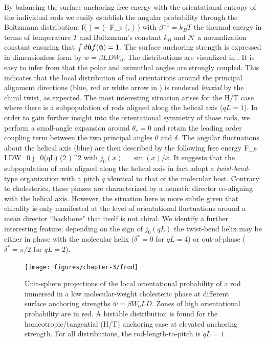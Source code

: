 By balancing the surface anchoring free energy with the orientational entropy of the individual rods we easily establish the angular probability through the Boltzmann distribution:
  \beq
  f( \bhu ) =  \exp (- \beta F_{s} (\delta, \theta)  )
  \label{fsingle}
  \eeq
 with $\beta^{-1} = k_{B}T$ the thermal energy in terms of temperature $T$ and Boltzmann's constant $k_{B}$ and $\mathcal{N}$ a normalization constant ensuring that $\int d {\bf \hat{u}} f({\bf \hat{u}}) = 1$.  The surface anchoring strength is expressed  in dimensionless form by $\bar{w} = \beta LDW_{0}$.  The distributions are visualized in .
It is easy to infer from  that the polar and azimuthal angles are strongly coupled. This indicates that the local distribution of rod orientations around the principal alignment directions (blue, red or white arrow in ) is rendered {\em biaxial} by the chiral twist, as expected.  The most interesting situation arises for the H/T case where there is a subpopulation of  rods aligned along the helical axis ($qL=1$). In order to gain further insight into the orientational symmetry of those rods, we perform a small-angle expansion around   $\theta_{e} = 0$ and retain the leading order coupling term between the two principal angles $\theta$ and $\delta$. The angular fluctuations about the helical axis (blue) are then described by the following free energy
\beq
F_{s} \approx {} LDW_{0}  j_{0}(qL) \cos (2 \delta) \theta^{2}
\label{ht_fluc_new}
\eeq
with $j_{0}(x) = \sin (x)/x$. It suggests that the subpopulation of rods aligned along the helical axis in fact adopt a {\em twist-bend}-type organization with a pitch $q$ identical to that of the molecular host. Contrary to cholesterics, these phases are characterized by a nematic director co-aligning with the helical axis. However, the situation here is more subtle given that  chirality is only manifested at the level of orientational fluctuations around a mean director ``backbone" that itself is not chiral.   We  identify a further interesting feature; depending on the sign of $j_{0}(qL)$ the twist-bend helix may be either in phase with the molecular helix ($\delta^{\ast} =0$ for  $qL=4$) or out-of-phase ($\delta^{\ast} = \pi/2$ for $qL=2$).


  \begin{figure}
	\texttt{[image: figures/chapter-3/frod]}
	\caption[Unit-sphere projections of the local orientational probability of a rod immersed in a low molecular-weight cholesteric]{ Unit-sphere projections of the local orientational probability of a rod immersed in a low molecular-weight cholesteric phase at different surface anchoring strengths $\bar{w} = \beta W_{0}LD$. Zones of high orientational probability are in red.  A bistable distribution is found for the homeotropic/tangential (H/T) anchoring case at elevated anchoring strength. For all distributions, the rod-length-to-pitch is $qL=1$. }
	\label{frod}
\end{figure}


